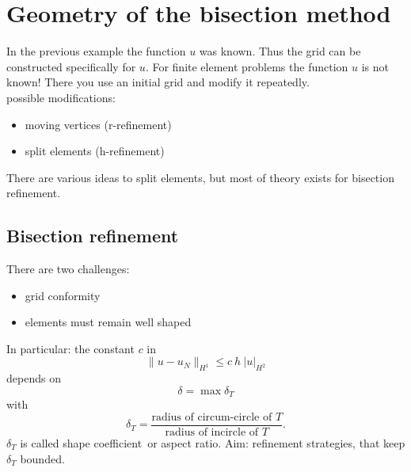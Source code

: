
\chapter{Geometry of the bisection method}
In the previous example the function $u$ was known. Thus the grid can be constructed specifically for $u$. For finite element problems the function $u $ is not known! There you use an initial grid and modify it repeatedly.\\
possible modifications:
\begin{itemize}
	\item moving vertices (r-refinement)
	\item split elements (h-refinement)
\end{itemize} 
There are various ideas to split elements, but most of theory exists for bisection refinement.
\section{Bisection refinement}


There are two challenges:
\begin{itemize}
	\item grid conformity
	
	\item elements must remain \glqq well shaped\grqq 
	
\end{itemize} 
In particular: the constant $c$ in 
\begin{equation*}
	\|u - u_{N}\|_{H^{1}} \leq c\ h\ |u|_{H^{2}}
\end{equation*} 
depends on 
\begin{equation*}
	\delta = \max \delta_{T} 
\end{equation*} 
with
\begin{equation*}
	\delta_{T}= \frac{\text{radius of circum-circle of }T}{\text{radius of incircle of }T}.
\end{equation*} 
$\delta_{T}$ is called \glqq shape coefficient\grqq\ or \glqq aspect ratio\grqq.\nl
Aim: refinement strategies, that keep $\delta_{T}$ bounded.

